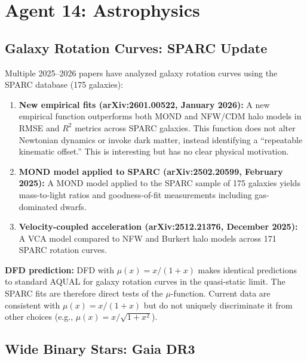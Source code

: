 \documentclass[11pt]{article}
\begin{document}
\section{Agent 14: Astrophysics}

\subsection{Galaxy Rotation Curves: SPARC Update}

Multiple 2025--2026 papers have analyzed galaxy rotation curves using
the SPARC database (175 galaxies):

\begin{enumerate}
  \item \textbf{New empirical fits (arXiv:2601.00522, January 2026):}
    A new empirical function outperforms both MOND and NFW/CDM halo
    models in RMSE and $R^2$ metrics across SPARC galaxies. This
    function does not alter Newtonian dynamics or invoke dark matter,
    instead identifying a ``repeatable kinematic offset.'' This is
    interesting but has no clear physical motivation.

  \item \textbf{MOND model applied to SPARC (arXiv:2502.20599,
    February 2025):} A MOND model applied to the SPARC sample of
    175 galaxies yields mass-to-light ratios and goodness-of-fit
    measurements including gas-dominated dwarfs.

  \item \textbf{Velocity-coupled acceleration (arXiv:2512.21376,
    December 2025):} A VCA model compared to NFW and Burkert halo
    models across 171 SPARC rotation curves.
\end{enumerate}

\textbf{DFD prediction:} DFD with $\mu(x) = x/(1+x)$ makes identical
predictions to standard AQUAL for galaxy rotation curves in the
quasi-static limit. The SPARC fits are therefore direct tests of the
$\mu$-function. Current data are consistent with $\mu(x) = x/(1+x)$
but do not uniquely discriminate it from other choices (e.g.,
$\mu(x) = x/\sqrt{1+x^2}$).

\subsection{Wide Binary Stars: Gaia DR3}
\end{document}
